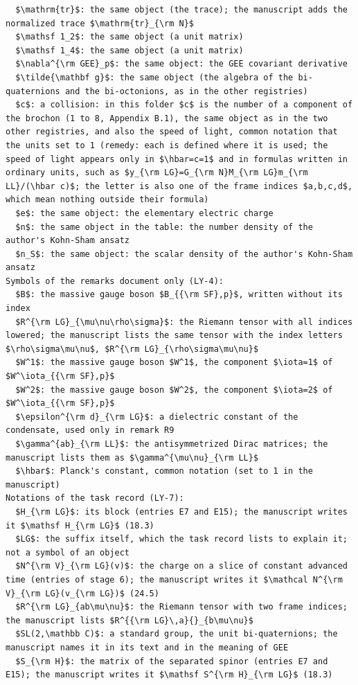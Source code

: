 \documentclass[
  10pt,
]{article}
\begin{document}
\begin{verbatim}
  $\mathrm{tr}$: the same object (the trace); the manuscript adds the normalized trace $\mathrm{tr}_{\rm N}$
  $\mathsf 1_2$: the same object (a unit matrix)
  $\mathsf 1_4$: the same object (a unit matrix)
  $\nabla^{\rm GEE}_p$: the same object: the GEE covariant derivative
  $\tilde{\mathbf g}$: the same object (the algebra of the bi-quaternions and the bi-octonions, as in the other registries)
  $c$: a collision: in this folder $c$ is the number of a component of the brochon (1 to 8, Appendix B.1), the same object as in the two other registries, and also the speed of light, common notation that the units set to 1 (remedy: each is defined where it is used; the speed of light appears only in $\hbar=c=1$ and in formulas written in ordinary units, such as $y_{\rm LG}=G_{\rm N}M_{\rm LG}m_{\rm LL}/(\hbar c)$; the letter is also one of the frame indices $a,b,c,d$, which mean nothing outside their formula)
  $e$: the same object: the elementary electric charge
  $n$: the same object in the table: the number density of the author's Kohn-Sham ansatz
  $n_S$: the same object: the scalar density of the author's Kohn-Sham ansatz
Symbols of the remarks document only (LY-4):
  $B$: the massive gauge boson $B_{{\rm SF},p}$, written without its index
  $R^{\rm LG}_{\mu\nu\rho\sigma}$: the Riemann tensor with all indices lowered; the manuscript lists the same tensor with the index letters $\rho\sigma\mu\nu$, $R^{\rm LG}_{\rho\sigma\mu\nu}$
  $W^1$: the massive gauge boson $W^1$, the component $\iota=1$ of $W^\iota_{{\rm SF},p}$
  $W^2$: the massive gauge boson $W^2$, the component $\iota=2$ of $W^\iota_{{\rm SF},p}$
  $\epsilon^{\rm d}_{\rm LG}$: a dielectric constant of the condensate, used only in remark R9
  $\gamma^{ab}_{\rm LL}$: the antisymmetrized Dirac matrices; the manuscript lists them as $\gamma^{\mu\nu}_{\rm LL}$
  $\hbar$: Planck's constant, common notation (set to 1 in the manuscript)
Notations of the task record (LY-7):
  $H_{\rm LG}$: its block (entries E7 and E15); the manuscript writes it $\mathsf H_{\rm LG}$ (18.3)
  $LG$: the suffix itself, which the task record lists to explain it; not a symbol of an object
  $N^{\rm V}_{\rm LG}(v)$: the charge on a slice of constant advanced time (entries of stage 6); the manuscript writes it $\mathcal N^{\rm V}_{\rm LG}(v_{\rm LG})$ (24.5)
  $R^{\rm LG}_{ab\mu\nu}$: the Riemann tensor with two frame indices; the manuscript lists $R^{{\rm LG}\,a}{}_{b\mu\nu}$
  $SL(2,\mathbb C)$: a standard group, the unit bi-quaternions; the manuscript names it in its text and in the meaning of GEE
  $S_{\rm H}$: the matrix of the separated spinor (entries E7 and E15); the manuscript writes it $\mathsf S^{\rm H}_{\rm LG}$ (18.3)

\end{verbatim}
\end{document}
